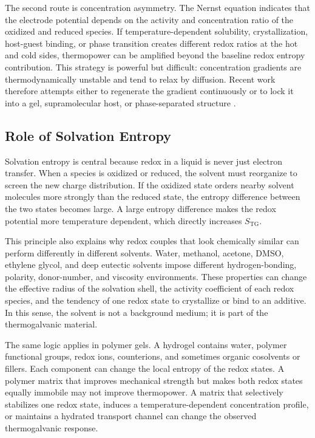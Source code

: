 \documentclass[a4paper,12pt]{report}
\begin{document}
The second route is concentration asymmetry. The Nernst equation indicates that
the electrode potential depends on the activity and concentration ratio of the
oxidized and reduced species. If temperature-dependent solubility,
crystallization, host-guest binding, or phase transition creates different
redox ratios at the hot and cold sides, thermopower can be amplified beyond the
baseline redox entropy contribution. This strategy is powerful but difficult:
concentration gradients are thermodynamically unstable and tend to relax by
diffusion. Recent work therefore attempts either to regenerate the gradient
continuously or to lock it into a gel, supramolecular host, or phase-separated
structure \citep{zhou2016supramolecular,yu2020thermosensitive,
guo2020nanoparticle}.

\subsection{Role of Solvation Entropy}

Solvation entropy is central because redox in a liquid is never just electron
transfer. When a species is oxidized or reduced, the solvent must reorganize to
screen the new charge distribution. If the oxidized state orders nearby solvent
molecules more strongly than the reduced state, the entropy difference between
the two states becomes large. A large entropy difference makes the redox
potential more temperature dependent, which directly increases
$S_{\mathrm{TG}}$.

This principle also explains why redox couples that look chemically similar can
perform differently in different solvents. Water, methanol, acetone, DMSO,
ethylene glycol, and deep eutectic solvents impose different hydrogen-bonding,
polarity, donor-number, and viscosity environments. These properties can change
the effective radius of the solvation shell, the activity coefficient of each
redox species, and the tendency of one redox state to crystallize or bind to an
additive. In this sense, the solvent is not a background medium; it is part of
the thermogalvanic material.

The same logic applies in polymer gels. A hydrogel contains water, polymer
functional groups, redox ions, counterions, and sometimes organic cosolvents or
fillers. Each component can change the local entropy of the redox states. A
polymer matrix that improves mechanical strength but makes both redox states
equally immobile may not improve thermopower. A matrix that selectively
stabilizes one redox state, induces a temperature-dependent concentration
profile, or maintains a hydrated transport channel can change the observed
thermogalvanic response.
\end{document}
